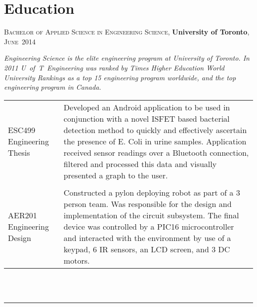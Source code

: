 \documentclass[a4paper,10pt]{article}
\begin{document}
\section{Education}

\begin{minipage}{\linewidth} \textsc{Bachelor of Applied Science in Engineering Science}, \textbf{\mbox{University} of Toronto}, \mbox{\textsc{June} 2014} \\
 \footnotesize{\vspace*{-\baselineskip}\begin{center} \textit{Engineering Science is the elite engineering program at University of Toronto. In 2011 \mbox{U of T Engineering} was ranked by Times Higher Education World University Rankings as a top 15 engineering program worldwide, and the top engineering program in Canada.\\}\end{center}}
\vspace{1ex}
\begin{tabular}{m{2.5cm}|m{13cm}}
\begin{flushright}\normalsize{ESC499 Engineering Thesis} \end{flushright} & \footnotesize{Developed an Android application to be used in conjunction with a novel ISFET based bacterial detection method to quickly and effectively ascertain the presence of E. Coli in urine samples. Application received sensor readings over a Bluetooth connection, filtered and processed this data and visually presented a graph to the user.} \\
\multicolumn{2}{c}{} \\
\begin{flushright}\normalsize{AER201 \mbox{Engineering} Design} \end{flushright}& \footnotesize{ Constructed a pylon deploying robot as part of a 3 person team. Was responsible for the design and implementation of the circuit subsystem. The final device was
controlled by a PIC16 microcontroller and interacted with the environment by use of a keypad, 6 IR }
sensors, an LCD screen, and 3 DC motors. \\
\end{tabular}\end{minipage}\\ \\

\hrule
\end{document}
